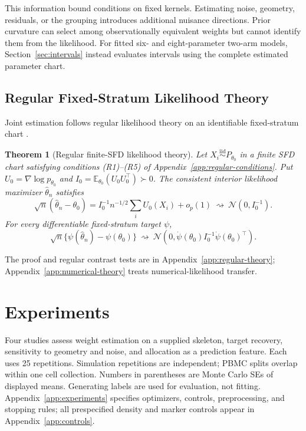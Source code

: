 \documentclass[10pt]{article}
\newcommand{\E}{\mathbb E}
\newcommand{\Normal}{\mathcal N}
\newtheorem{theorem}{Theorem}
\theoremstyle{definition}
\theoremstyle{plain}
\begin{document}
This information bound conditions on fixed kernels. Estimating noise,
geometry, residuals, or the grouping introduces additional nuisance
directions. Prior curvature can select among observationally equivalent
weights but cannot identify them from the likelihood. For fitted six- and
eight-parameter two-arm models, Section~\ref{sec:intervals} instead evaluates
intervals using the complete estimated parameter chart.

\subsection{Regular Fixed-Stratum Likelihood Theory}
Joint estimation follows regular likelihood theory on an identifiable
fixed-stratum chart \citep{vandervaart1998asymptotic}.

\begin{theorem}[Regular finite-SFD likelihood theory]
\label{thm:regular-finite-sfd}
Let $X_i\stackrel{\mathrm{iid}}\sim P_{\theta_0}$ in a finite SFD chart
satisfying conditions \textup{(R1)--(R5)} of
Appendix~\ref{app:regular-conditions}. Put
$U_0=\nabla\log p_{\theta_0}$ and
$I_0=\E_{\theta_0}(U_0U_0^\top)\succ0$.
The consistent interior likelihood maximizer $\hat\theta_n$ satisfies
\begin{equation}
 \sqrt n(\hat\theta_n-\theta_0)
 =I_0^{-1}n^{-1/2}\sum_i U_0(X_i)+o_p(1)
 \ \rightsquigarrow\ \Normal(0,I_0^{-1}).
 \label{eq:regular-limit}
\end{equation}
For every differentiable fixed-stratum target $\psi$,
\begin{equation}
 \sqrt n\{\psi(\hat\theta_n)-\psi(\theta_0)\}
 \ \rightsquigarrow\ \Normal\!\left(0,
 \dot\psi(\theta_0)I_0^{-1}\dot\psi(\theta_0)^\top\right).
 \label{eq:target-limit}
\end{equation}
\end{theorem}
The proof and regular contrast tests are in Appendix~\ref{app:regular-theory};
Appendix~\ref{app:numerical-theory} treats numerical-likelihood transfer.

\clearpage
\section{Experiments}
\label{sec:experiments}
Four studies assess weight estimation on a supplied skeleton, target recovery,
sensitivity to geometry and noise, and allocation as a prediction feature.
Each uses 25 repetitions. Simulation
repetitions are independent; PBMC splits overlap within one cell collection.
Numbers in parentheses are Monte Carlo SEs of displayed means. Generating
labels are used for evaluation, not fitting. Appendix~\ref{app:experiments}
specifies optimizers, controls, preprocessing, and stopping rules; all
prespecified density and marker controls appear in Appendix~\ref{app:controls}.
\end{document}
